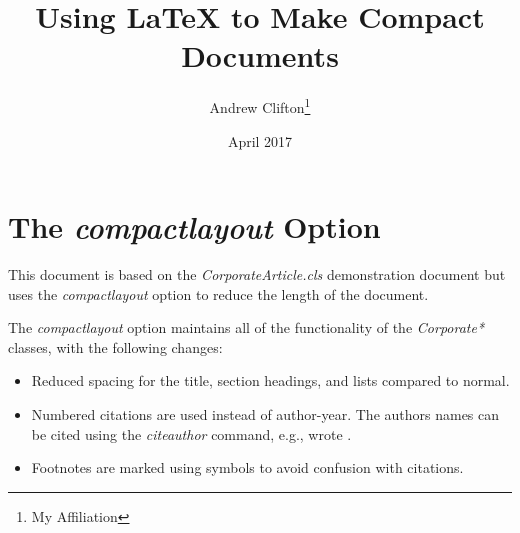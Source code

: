\documentclass[draft,twocolumn,compactlayout]{CorporateArticle}
\title{Using LaTeX to Make Compact Documents}
\author{Andrew Clifton\thanks{My Affiliation}}
\date{April 2017}
\begin{document}
\maketitle

\section*{The \emph{compactlayout} Option}

This document is based on the \emph{CorporateArticle.cls} demonstration document but uses the \emph{compactlayout} option to reduce the length of the document.

The \emph{compactlayout} option maintains all of the functionality of the \emph{Corporate*} classes, with the following changes:
\begin{itemize}
\item Reduced spacing for the title, section headings, and lists compared to normal.
\item Numbered citations are used \citep[e.g.,][]{TechReportTest} instead of author-year. The authors names can be cited using the \emph{citeauthor} command, e.g., \citeauthor{TechReportTest} wrote \cite{TechReportTest}.
\item Footnotes are marked using symbols to avoid confusion with citations.  
\end{itemize}

\clearpage


\tableofcontents
\listoffigures
\listoftables

\lstset{language=[LaTeX]Tex,columns=fullflexible,keepspaces=true,breaklines=true}





\label{sec:TheBibliography}
\printbibliography

\appendix


\end{document}
